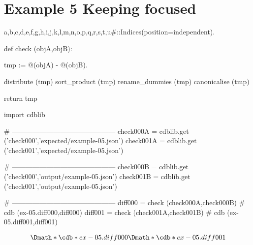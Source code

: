 \documentclass[12pt]{cdblatex}
\begin{document}
\section*{Example 5 Keeping focused}


\begin{cadabra}
   {a,b,c,d,e,f,g,h,i,j,k,l,m,n,o,p,q,r,s,t,u#}::Indices(position=independent).

   def check (objA,objB):

       tmp := @(objA) - @(objB).

       distribute     (tmp)
       sort_product   (tmp)
       rename_dummies (tmp)
       canonicalise   (tmp)

       return tmp

   import cdblib

   # ---------------------------------------------
   check000A = cdblib.get ('check000','expected/example-05.json')
   check001A = cdblib.get ('check001','expected/example-05.json')

   # ---------------------------------------------
   check000B = cdblib.get ('check000','output/example-05.json')
   check001B = cdblib.get ('check001','output/example-05.json')

   # ---------------------------------------------
   diff000 = check (check000A,check000B)   # cdb (ex-05.diff000,diff000)
   diff001 = check (check001A,check001B)   # cdb (ex-05.diff001,diff001)

\end{cadabra}


\begin{dgroup*}
   \Dmath*{\cdb*{ex-05.diff000}}
   \Dmath*{\cdb*{ex-05.diff001}}
\end{dgroup*}
\end{document}

